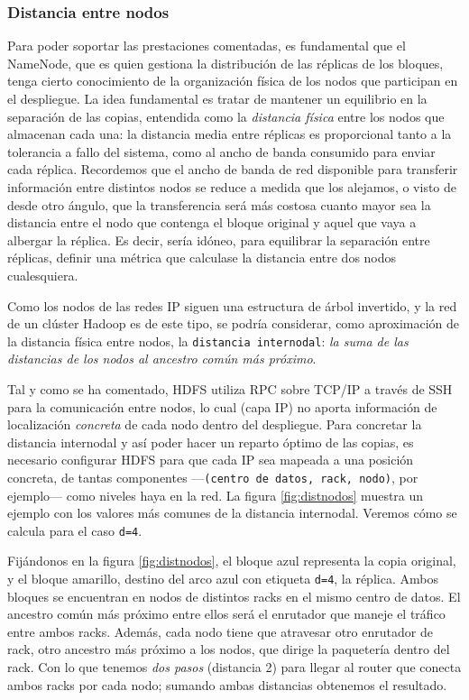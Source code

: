 \subsubsection{Distancia entre nodos}\label{subsubsec:distnodos}
\noindent Para poder soportar las prestaciones comentadas, es fundamental que el NameNode, que es quien gestiona la distribuci\'on de las r\'eplicas de los bloques, tenga cierto conocimiento de la organizaci\'on f\'isica de los nodos que participan en el despliegue. La idea fundamental es tratar de mantener un equilibrio en la separaci\'on de las copias, entendida como la \emph{distancia f\'isica} entre los nodos que almacenan cada una: la distancia media entre r\'eplicas es proporcional tanto a la tolerancia a fallo del sistema, como al ancho de banda consumido para enviar cada r\'eplica. Recordemos que el ancho de banda de red disponible para transferir informaci\'on entre distintos nodos se reduce a medida que los alejamos, o visto de desde otro \'angulo, que la transferencia ser\'a m\'as costosa cuanto mayor sea la distancia entre el nodo que contenga el bloque original y aquel que vaya a albergar la r\'eplica. Es decir, ser\'ia id\'oneo, para equilibrar la separaci\'on entre r\'eplicas, definir una m\'etrica que calculase la distancia entre dos nodos cualesquiera.\newline

Como los nodos de las redes IP siguen una estructura de \'arbol invertido, y la red de un cl\'uster Hadoop es de este tipo, se podr\'ia considerar, como aproximaci\'on de la distancia f\'isica entre nodos, la \texttt{distancia internodal}: \emph{la suma de las distancias de los nodos al ancestro com\'un m\'as pr\'oximo}.\newline

Tal y como se ha comentado, HDFS utiliza RPC sobre TCP/IP a trav\'es de SSH para la comunicaci\'on entre nodos, lo cual (capa IP) no aporta informaci\'on de localizaci\'on \emph{concreta} de cada nodo dentro del despliegue. Para concretar la distancia internodal y as\'i poder hacer un reparto \'optimo de las copias, es necesario configurar HDFS para que cada IP sea mapeada a una posici\'on concreta, de tantas componentes ---\texttt{(centro de datos, rack, nodo)}, por ejemplo--- como niveles haya en la red. La figura \ref{fig:distnodos} muestra un ejemplo con los valores m\'as comunes de la distancia internodal. Veremos c\'omo se calcula para el caso \texttt{d=4}.\newline

Fij\'andonos en la figura \ref{fig:distnodos}, el bloque azul representa la copia original, y el bloque amarillo, destino del arco azul con etiqueta \texttt{d=4}, la r\'eplica. Ambos bloques se encuentran en nodos de distintos racks en el mismo centro de datos. El ancestro com\'un m\'as pr\'oximo entre ellos ser\'a el enrutador que maneje el tr\'afico entre ambos racks. Adem\'as, cada nodo tiene que atravesar otro enrutador de rack, otro ancestro m\'as pr\'oximo a los nodos, que dirige la paqueter\'ia dentro del rack. Con lo que tenemos \emph{dos pasos} (distancia 2) para llegar al router que conecta ambos racks por cada nodo; sumando ambas distancias obtenemos el resultado.

